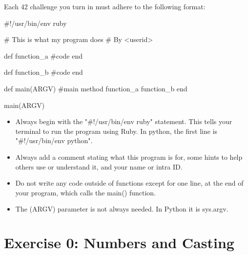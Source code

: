 \documentclass{42-en}
\begin{document}
Each 42 challenge you turn in must adhere to the following format:

\begin{42rbcode}
#!/usr/bin/env ruby

# This is what my program does
# By <userid>

def function_a
 #code
end

def function_b
 #code
end

def main(ARGV)
 #main method
 function_a
 function_b
end

main(ARGV)
\end{42rbcode}

\begin{itemize}
	\item Always begin with the "\#!/usr/bin/env ruby" statement. This tells your terminal to run the program using Ruby. In python, the first line is "\#!/usr/bin/env python".
	\item Always add a comment stating what this program is for, some hints to help others use or understand it, and your name or intra ID.
	\item Do not write any code outside of functions except for one line, at the end of your program, which calls the main() function.
	\item The (ARGV) parameter is not always needed. In Python it is sys.argv.
\end{itemize}


\startexercices



\chapter{Exercise 0: Numbers and Casting}

\makeheaderfiles
\end{document}
